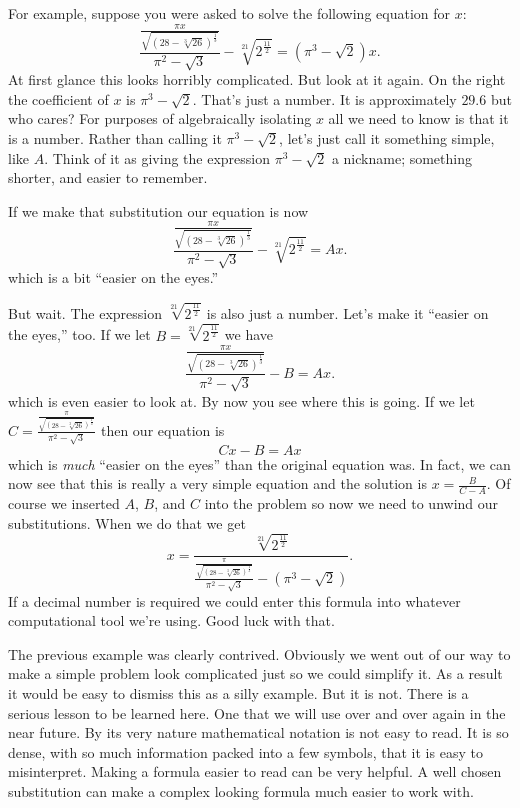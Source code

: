   \begin{myexample}
    \label{example:Sub1}
    For example, suppose you were asked to solve the following
    equation for $x$:
  $$
  \frac{\frac{\pi x}{\sqrt{(28-\sqrt[3]{26})^{\frac{1}{3}}}}}{\pi^2-\sqrt{3}}
  - \sqrt[21]{2^{\frac{11}{2}}}= (\pi^3-\sqrt{2})x.
  $$
  At first glance this looks horribly complicated.  But look at it
  again.  On the right the coefficient of $x$ is $\pi^3-\sqrt{2}.$
  That's just a number. It is approximately $29.6$ but who cares? For
  purposes of algebraically isolating $x$ all we need to know is that
  it is a number. Rather than calling it $\pi^3-\sqrt{2}$, let's
  just call it something simple, like $A$. Think of it as giving the
  expression $\pi^3-\sqrt{2}$ a nickname; something shorter, and
  easier to remember.

  If we make that substitution our equation is now
  $$
  \frac{\frac{\pi x}{\sqrt{(28-\sqrt[3]{26})^{\frac{1}{3}}}}}{\pi^2-\sqrt{3}}
  - \sqrt[21]{2^{\frac{11}{2}}}= Ax.
  $$
  which is a bit ``easier on the eyes.''

  But wait. The expression $\sqrt[21]{2^{\frac{11}{2}}}$ is also just a
  number. Let's make it ``easier on the eyes,'' too. If we let
  $B=\sqrt[21]{2^{\frac{11}{2}}}$ we have
  $$
  \frac{\frac{\pi x}{\sqrt{(28-\sqrt[3]{26})^{\frac{1}{3}}}}}{\pi^2-\sqrt{3}}
  - B= Ax.
  $$
  which is even easier to look at. By now you see where this is
  going. If we let
  $C=\frac{\frac{\pi}{\sqrt{(28-\sqrt[3]{26})^{\frac{1}{3}}}}}{\pi^2-\sqrt{3}}$
  then our equation is
  $$
  Cx-B=Ax
  $$
  which is \emph{much} ``easier on the eyes'' than the original
  equation was. In fact, we can now see that this is really a very
  simple equation and the solution is $x=\frac{B}{C-A}$. Of course we
  inserted $A$, $B$, and $C$ into the problem so now we need to unwind
  our
  substitutions. When we do that we get\\
$$
  x=\frac{\sqrt[21]{2^{\frac{11}{2}}}}{\frac{\frac{\pi}{\sqrt{(28-\sqrt[3]{26})^{\frac{1}{3}}}}}{\pi^2-\sqrt{3}}
    - (\pi^3-\sqrt{2})}.
  $$
  If a decimal number is required we could enter this formula into
  whatever computational tool we're using. Good luck with that.
\end{myexample}


The previous example was clearly contrived.  Obviously we went
out of our way to make a simple problem look complicated just so we
could simplify it. As a result it would be easy to dismiss this as a
silly example. But it is not. There is a serious lesson to be learned
here. One that we will use over and over again in the near future.  By
its very nature mathematical notation is not easy to read. It is so
dense, with so much information packed into a few symbols, that it is
easy to misinterpret. Making a formula easier to read can be very
helpful.  A well chosen substitution can make a complex looking
formula much easier to work with.

